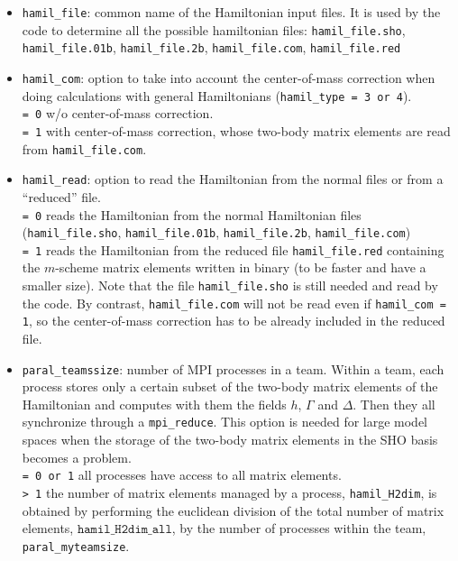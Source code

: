 \documentclass[a4paper,11pt]{article}
\newcommand{\ttt}[1]{\texttt{#1}}
\begin{document}
\begin{itemize}
\item \ttt{hamil\_file}: common name of the Hamiltonian input files. It is used by the code to determine all the possible
 hamiltonian files: \ttt{hamil\_file.sho}, \ttt{hamil\_file.01b}, \ttt{hamil\_file.2b}, \ttt{hamil\_file.com}, \ttt{hamil\_file.red}
\item \ttt{hamil\_com}: option to take into account the center-of-mass correction when doing calculations with general Hamiltonians
 (\ttt{hamil\_type = 3 or 4}).\\[0.05cm]
 \ttt{= 0\:}  w/o center-of-mass correction. \\[0.05cm]
 \ttt{= 1\:}  with center-of-mass correction, whose two-body matrix elements are read from \ttt{hamil\_file.com}.
\item \ttt{hamil\_read}: option to read the Hamiltonian from the normal files or from a ``reduced'' file. \\[0.05cm]
 \ttt{= 0\:}  reads the Hamiltonian from the normal Hamiltonian files (\ttt{hamil\_file.sho}, \ttt{hamil\_file.01b}, \ttt{hamil\_file.2b}, 
           \ttt{hamil\_file.com})  \\[0.05cm]
 \ttt{= 1\:}  reads the Hamiltonian from the reduced file \ttt{hamil\_file.red} containing the $m$-scheme matrix elements written 
           in binary (to be faster and have a smaller size). Note that the file \ttt{hamil\_file.sho} is still needed and read by the code.
           By contrast, \ttt{hamil\_file.com} will not be read even if \ttt{hamil\_com = 1}, so the center-of-mass correction has to be
           already included in the reduced file.
\item \ttt{paral\_teamssize}: number of MPI processes in a team. Within a team, each process stores only a certain subset of the two-body matrix
 elements of the Hamiltonian and computes with them the fields $h$, $\Gamma$ and $\Delta$. Then they all synchronize through a \ttt{mpi\_reduce}. This option is needed
 for large model spaces when the storage of the two-body matrix elements in the SHO basis becomes a problem. \\[0.05cm]
 \ttt{= 0 or 1\:} all processes have access to all matrix elements. \\[0.05cm]
 \ttt{> 1\:} the number of matrix elements managed by a process, \ttt{hamil\_H2dim}, is obtained by performing the euclidean division
             of the total number of matrix elements, $\ttt{hamil\_H2dim\_all}$, by the number of processes within the team, \ttt{paral\_myteamsize}.

\end{itemize}
\end{document}
